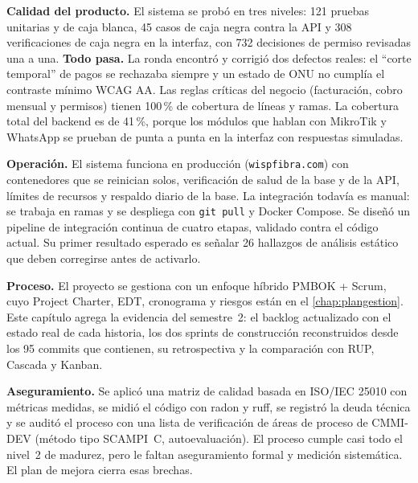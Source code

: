 \textbf{Calidad del producto.} El sistema se probó en tres niveles: 121 pruebas unitarias y
de caja blanca, 45 casos de caja negra contra la API y 308 verificaciones de caja negra en la
interfaz, con 732 decisiones de permiso revisadas una a una. \textbf{Todo pasa.} La ronda
encontró y corrigió dos defectos reales: el ``corte temporal'' de pagos se rechazaba siempre y
un estado de ONU no cumplía el contraste mínimo WCAG AA. Las reglas críticas del negocio
(facturación, cobro mensual y permisos) tienen 100\,\% de cobertura de líneas y ramas. La
cobertura total del backend es de 41\,\%, porque los módulos que hablan con MikroTik y WhatsApp
se prueban de punta a punta en la interfaz con respuestas simuladas.

\textbf{Operación.} El sistema funciona en producción (\texttt{wispfibra.com}) con
contenedores que se reinician solos, verificación de salud de la base y de la API, límites de
recursos y respaldo diario de la base. La integración todavía es manual: se trabaja en ramas y
se despliega con \texttt{git pull} y Docker Compose. Se diseñó un pipeline de integración
continua de cuatro etapas, validado contra el código actual. Su primer resultado esperado es
señalar 26 hallazgos de análisis estático que deben corregirse antes de activarlo.

\textbf{Proceso.} El proyecto se gestiona con un enfoque híbrido PMBOK + Scrum, cuyo Project
Charter, EDT, cronograma y riesgos están en el \cref{chap:plangestion}. Este capítulo agrega la
evidencia del semestre~2: el backlog actualizado con el estado real de cada historia, los dos
sprints de construcción reconstruidos desde los 95 commits que contienen, su retrospectiva y la
comparación con RUP, Cascada y Kanban.

\textbf{Aseguramiento.} Se aplicó una matriz de calidad basada en ISO/IEC 25010 con métricas
medidas, se midió el código con radon y ruff, se registró la deuda técnica y se auditó el
proceso con una lista de verificación de áreas de proceso de CMMI-DEV (método tipo SCAMPI~C,
autoevaluación). El proceso cumple casi todo el nivel~2 de madurez, pero le faltan
aseguramiento formal y medición sistemática. El plan de mejora cierra esas brechas.

